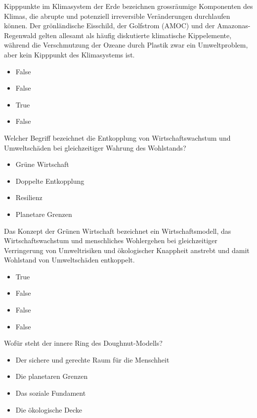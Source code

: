 \documentclass[
  nswissgerman,
  a4paper,
  openany]{book}
\providecommand{\tightlist}{%
  \setlength{\itemsep}{0pt}\setlength{\parskip}{0pt}}
\begin{document}
Kipppunkte im Klimasystem der Erde bezeichnen grossräumige Komponenten
des Klimas, die abrupte und potenziell irreversible Veränderungen
durchlaufen können. Der grönländische Eisschild, der Golfstrom (AMOC)
und der Amazonas-Regenwald gelten allesamt als häufig diskutierte
klimatische Kippelemente, während die Verschmutzung der Ozeane durch
Plastik zwar ein Umweltproblem, aber kein Kipppunkt des Klimasystems
ist.

\begin{itemize}
\tightlist
\item
  False
\item
  False
\item
  True
\item
  False
\end{itemize}

Welcher Begriff bezeichnet die Entkopplung von Wirtschaftswachstum und
Umweltschäden bei gleichzeitiger Wahrung des Wohlstands?

\begin{itemize}
\tightlist
\item[$\square$]
  Grüne Wirtschaft
\item[$\square$]
  Doppelte Entkopplung
\item[$\square$]
  Resilienz
\item[$\square$]
  Planetare Grenzen
\end{itemize}

Das Konzept der Grünen Wirtschaft bezeichnet ein Wirtschaftsmodell, das
Wirtschaftswachstum und menschliches Wohlergehen bei gleichzeitiger
Verringerung von Umweltrisiken und ökologischer Knappheit anstrebt und
damit Wohlstand von Umweltschäden entkoppelt.

\begin{itemize}
\tightlist
\item
  True
\item
  False
\item
  False
\item
  False
\end{itemize}

Wofür steht der innere Ring des Doughnut-Modells?

\begin{itemize}
\tightlist
\item[$\square$]
  Der sichere und gerechte Raum für die Menschheit
\item[$\square$]
  Die planetaren Grenzen
\item[$\square$]
  Das soziale Fundament
\item[$\square$]
  Die ökologische Decke
\end{itemize}
\end{document}
